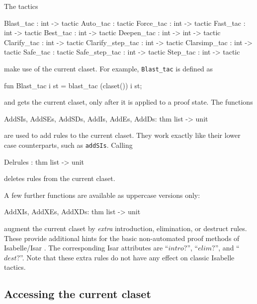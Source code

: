 The tactics
\begin{ttbox}
Blast_tac        : int -> tactic
Auto_tac         :        tactic
Force_tac        : int -> tactic
Fast_tac         : int -> tactic
Best_tac         : int -> tactic
Deepen_tac       : int -> int -> tactic
Clarify_tac      : int -> tactic
Clarify_step_tac : int -> tactic
Clarsimp_tac     : int -> tactic
Safe_tac         :        tactic
Safe_step_tac    : int -> tactic
Step_tac         : int -> tactic
\end{ttbox}
%
make use of the current claset.  For example, \texttt{Blast_tac} is defined as 
\begin{ttbox}
fun Blast_tac i st = blast_tac (claset()) i st;
\end{ttbox}
and gets the current claset, only after it is applied to a proof state.  
The functions
\begin{ttbox}
AddSIs, AddSEs, AddSDs, AddIs, AddEs, AddDs: thm list -> unit
\end{ttbox}
  
  
are used to add rules to the current claset.  They work exactly like their
lower case counterparts, such as \texttt{addSIs}.  Calling
\begin{ttbox}
Delrules : thm list -> unit
\end{ttbox}
deletes rules from the current claset. 

\medskip A few further functions are available as uppercase versions only:
\begin{ttbox}
AddXIs, AddXEs, AddXDs: thm list -> unit
\end{ttbox}
   augment the
current claset by \emph{extra} introduction, elimination, or destruct rules.
These provide additional hints for the basic non-automated proof methods of
Isabelle/Isar \cite{isabelle-isar-ref}.  The corresponding Isar attributes are
``$intro?$'', ``$elim?$'', and ``$dest?$''.  Note that these extra rules do
not have any effect on classic Isabelle tactics.


\subsection{Accessing the current claset}
\label{sec:access-current-claset}

